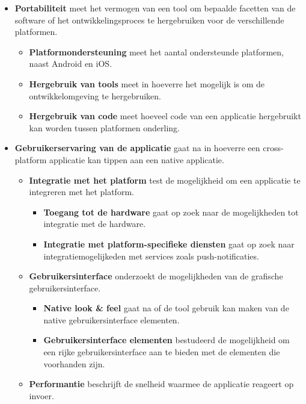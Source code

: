 \documentclass[a4paper]{IEEEconf}
\begin{document}
\begin{itemize}
    \item \textbf{Portabiliteit} meet het vermogen van een tool om bepaalde facetten van de software of het ontwikkelingsproces te hergebruiken voor de verschillende platformen.
    \begin{itemize}
        \item \textbf{Platformondersteuning} meet het aantal ondersteunde platformen, naast Android en iOS. 
        \item \textbf{Hergebruik van tools} meet in hoeverre het mogelijk is om de ontwikkelomgeving te hergebruiken.
        \item \textbf{Hergebruik van code} meet hoeveel code van een applicatie hergebruikt kan worden tussen platformen onderling.
    \end{itemize}
    \item \textbf{Gebruikerservaring van de applicatie} gaat na in hoeverre een cross-platform applicatie kan tippen aan een native applicatie.
    \begin{itemize}
        \item \textbf{Integratie met het platform} test de mogelijkheid om een applicatie te integreren met het platform.
        \begin{itemize}
            \item \textbf{Toegang tot de hardware} gaat op zoek naar de mogelijkheden tot integratie met de hardware. 
            \item \textbf{Integratie met platform-specifieke diensten} gaat op zoek naar integratiemogelijkeden met services zoals push-notificaties.
        \end{itemize}
        \item \textbf{Gebruikersinterface} onderzoekt de mogelijkheden van de grafische gebruikersinterface.
        \begin{itemize}
            \item \textbf{Native look \& feel} gaat na of de tool gebruik kan maken van de native gebruikersinterface elementen.
            \item \textbf{Gebruikersinterface elementen} bestudeerd de mogelijkheid om een rijke gebruikersinterface aan te bieden met de elementen die voorhanden zijn.
        \end{itemize}
        \item \textbf{Performantie} beschrijft de snelheid waarmee de applicatie reageert op invoer.
    \end{itemize}

\end{itemize}
\end{document}
